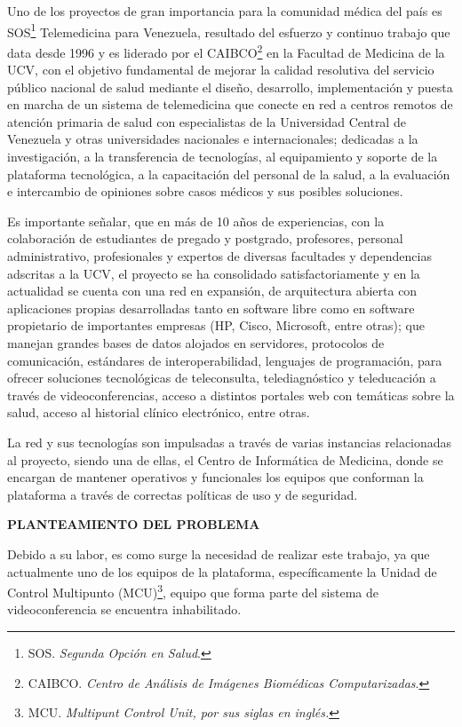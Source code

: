 \documentclass[12pt,letterpaper]{article}
\begin{document}
Uno de los proyectos de gran importancia para la comunidad médica del país es SOS\footnote{SOS. \emph{Segunda Opción en Salud}.} Telemedicina para Venezuela, resultado del esfuerzo y continuo trabajo que data desde 1996 y es liderado por el CAIBCO\footnote{CAIBCO. \emph{Centro de Análisis de Imágenes Biomédicas Computarizadas}.} en la Facultad de Medicina de la UCV, con el objetivo fundamental de mejorar la calidad resolutiva del servicio público nacional de salud mediante el diseño, desarrollo, implementación y puesta en marcha de un sistema de telemedicina que conecte en red a centros remotos de atención primaria de salud con especialistas de la Universidad Central de Venezuela y otras universidades nacionales e internacionales; dedicadas a la investigación, a la transferencia de tecnologías, al equipamiento y soporte de la plataforma tecnológica, a la capacitación del personal de la salud, a la evaluación e intercambio de opiniones sobre casos médicos y sus posibles soluciones. 

Es importante señalar, que en más de 10 años de experiencias, con la colaboración de estudiantes de pregado y postgrado, profesores, personal administrativo, profesionales y expertos de diversas facultades y dependencias adscritas a la UCV, el proyecto se ha consolidado satisfactoriamente y en la actualidad se cuenta con una red en expansión, de arquitectura abierta con aplicaciones propias desarrolladas tanto en software libre como en software propietario de importantes empresas (HP, Cisco, Microsoft, entre otras); que manejan grandes bases de datos alojados en servidores, protocolos de comunicación, estándares de interoperabilidad, lenguajes de programación, para ofrecer soluciones tecnológicas de teleconsulta, telediagnóstico y teleducación a través de videoconferencias, acceso a distintos portales web con temáticas sobre la salud, acceso al historial clínico electrónico, entre otras. 

La red y sus tecnologías son impulsadas a través de varias instancias relacionadas al proyecto, siendo una de ellas, el Centro de Informática de Medicina, donde se encargan de mantener operativos y funcionales los equipos que conforman la plataforma a través de correctas políticas de uso y de seguridad. 
   
\centerline{\textbf{PLANTEAMIENTO DEL PROBLEMA}}


Debido a su labor, es como surge la necesidad de realizar este trabajo, ya que actualmente uno de los equipos de la plataforma, específicamente la Unidad de Control Multipunto (MCU)\footnote{MCU. \emph{Multipunt Control Unit, por sus siglas en inglés.}}, equipo que forma parte del sistema de videoconferencia se encuentra inhabilitado.
\end{document}
